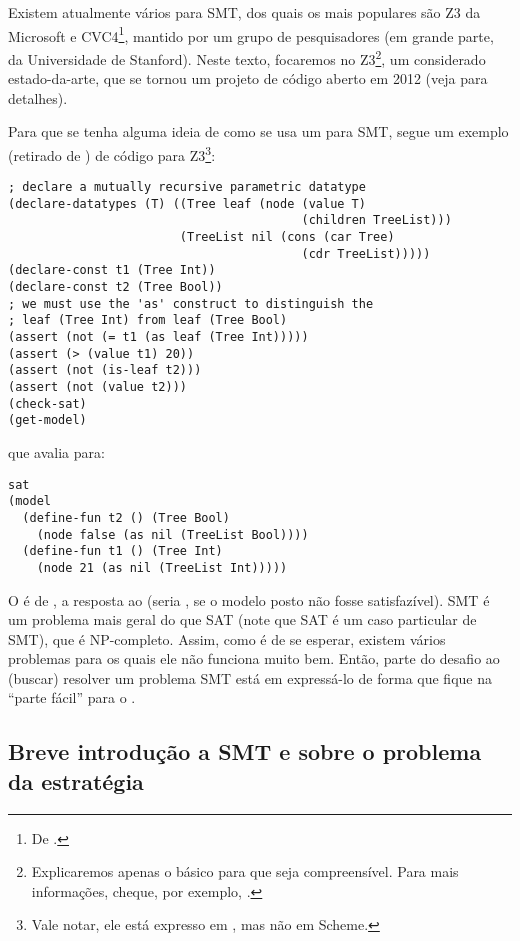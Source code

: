 \documentclass{article}
\begin{document}
Existem atualmente vários  para SMT, dos quais os mais
populares são Z3 da Microsoft e CVC4\footnote{De
  .}, mantido por um grupo de
pesquisadores (em grande parte, da Universidade de Stanford). Neste
texto, focaremos no Z3\footnote{Explicaremos apenas o básico para que
  seja compreensível. Para mais informações, cheque, por exemplo,
  \cite{z3}.}, um  considerado
estado-da-arte, que se tornou um projeto de código aberto em 2012
(veja \cite{leo} para detalhes).

Para que se tenha alguma ideia de como se usa um  para SMT,
segue um exemplo (retirado de \cite{tuto}) de código para
Z3\footnote{Vale notar, ele está expresso em , mas
  não em Scheme.}:

\begin{lstlisting}
; declare a mutually recursive parametric datatype
(declare-datatypes (T) ((Tree leaf (node (value T)
                                         (children TreeList)))
                        (TreeList nil (cons (car Tree)
                                         (cdr TreeList)))))
(declare-const t1 (Tree Int))
(declare-const t2 (Tree Bool))
; we must use the 'as' construct to distinguish the
; leaf (Tree Int) from leaf (Tree Bool)
(assert (not (= t1 (as leaf (Tree Int)))))
(assert (> (value t1) 20))
(assert (not (is-leaf t2)))
(assert (not (value t2)))
(check-sat)
(get-model)
\end{lstlisting}

\noindent que avalia para:

\begin{lstlisting}
sat
(model
  (define-fun t2 () (Tree Bool)
    (node false (as nil (TreeList Bool))))
  (define-fun t1 () (Tree Int)
    (node 21 (as nil (TreeList Int)))))
\end{lstlisting}

O  é de , a resposta ao
 (seria , se o modelo posto não
fosse satisfazível). SMT é um problema mais geral do que SAT (note
que SAT é um caso particular de SMT), que é
NP-completo. Assim, como é de se esperar, existem vários problemas
para os quais ele não funciona muito bem. Então, parte do desafio ao
(buscar) resolver um problema SMT está em expressá-lo de forma que
fique na ``parte fácil'' para o .

\subsection{Breve introdução a SMT e sobre o problema da estratégia}
\end{document}
